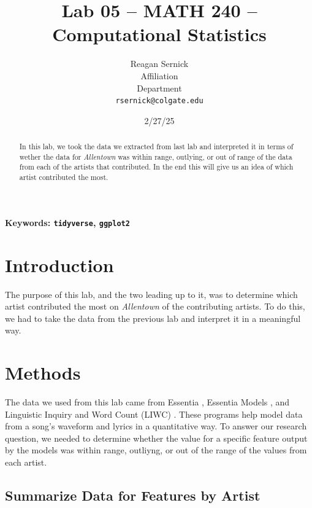 \documentclass{article}\usepackage[]{graphicx}\usepackage[]{xcolor}
\begin{document}
\vspace{-1in}
\title{Lab 05 -- MATH 240 -- Computational Statistics}

\author{
  Reagan Sernick \\
  Affiliation  \\
  Department  \\
  {\tt rsernick@colgate.edu}
}

\date{2/27/25}

\maketitle

\begin{multicols}{2}
\begin{abstract}
In this lab, we took the data we extracted from last lab and interpreted it in terms of wether the data for \emph{Allentown} was within range, outlying, or out of range of the data from each of the artists that contributed. In the end this will give us an idea of which artist contributed the most.
\end{abstract}

\noindent \textbf{Keywords: \texttt{tidyverse}, \texttt{ggplot2}} 

\section{Introduction}

The purpose of this lab, and the two leading up to it, was to determine which artist contributed the most on \emph{Allentown} of the contributing artists. To do this, we had to take the data from the previous lab and interpret it in a meaningful way.

\section{Methods}

The data we used from this lab came from Essentia \citep{Essentia}, Essentia Models \citep{EssentiaModels}, and Linguistic Inquiry and Word Count (LIWC) \citep{LIWC}. These programs help model data from a song's waveform and lyrics in a quantitative way. To answer our research question, we needed to determine whether the value for a specific feature output by the models was within range, outliyng, or out of the range of the values from each artist.

\subsection{Summarize Data for Features by Artist}


\end{multicols}
\end{document}
